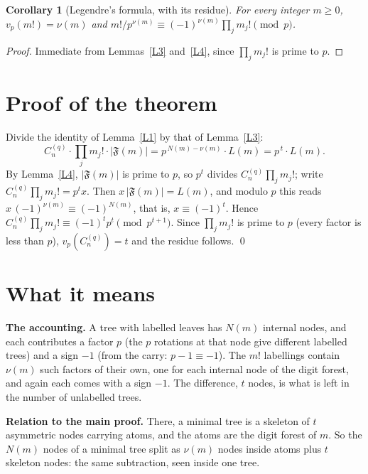 \documentclass[11pt]{article}
\newtheorem{corollary}{Corollary}
\theoremstyle{remark}
\newcommand{\F}{\mathfrak F}
\newcommand{\C}{C_n^{(q)}}
\begin{document}
\begin{corollary}[Legendre's formula, with its residue]
For every integer $m\ge0$, $v_p(m!)=\nu(m)$ and
$m!/p^{\nu(m)}\equiv(-1)^{\nu(m)}\prod_jm_j!\pmod p$.
\end{corollary}
\begin{proof}
Immediate from Lemmas~\ref{L3} and~\ref{L4}, since $\prod_jm_j!$ is prime to $p$.
\end{proof}

\section{Proof of the theorem}

Divide the identity of Lemma~\ref{L1} by that of Lemma~\ref{L3}:
\[
 \C\cdot\prod_jm_j!\cdot|\F(m)|=p^{\,N(m)-\nu(m)}\cdot L(m)=p^{\,t}\cdot L(m).
\]
By Lemma~\ref{L4}, $|\F(m)|$ is prime to $p$, so $p^t$ divides $\C\prod_jm_j!$; write
$\C\prod_jm_j!=p^tx$. Then $x\,|\F(m)|=L(m)$, and modulo $p$ this reads
$x\,(-1)^{\nu(m)}\equiv(-1)^{N(m)}$, that is, $x\equiv(-1)^t$. Hence
$\C\prod_jm_j!\equiv(-1)^tp^t\pmod{p^{t+1}}$. Since $\prod_jm_j!$ is prime to $p$ (every factor
is less than $p$), $v_p(\C)=t$ and the residue follows. \qed

\section{What it means}

\textbf{The accounting.} A tree with labelled leaves has $N(m)$ internal nodes, and each
contributes a factor $p$ (the $p$ rotations at that node give different labelled trees) and a
sign $-1$ (from the carry: $p-1\equiv-1$). The $m!$ labellings contain $\nu(m)$ such factors
of their own, one for each internal node of the digit forest, and again each comes with a
sign $-1$. The difference, $t$ nodes, is what is left in the number of unlabelled trees.

\textbf{Relation to the main proof.} There, a minimal tree is a skeleton of $t$ asymmetric
nodes carrying atoms, and the atoms are the digit forest of $m$. So the $N(m)$ nodes of a
minimal tree split as $\nu(m)$ nodes inside atoms plus $t$ skeleton nodes: the same
subtraction, seen inside one tree.
\end{document}
